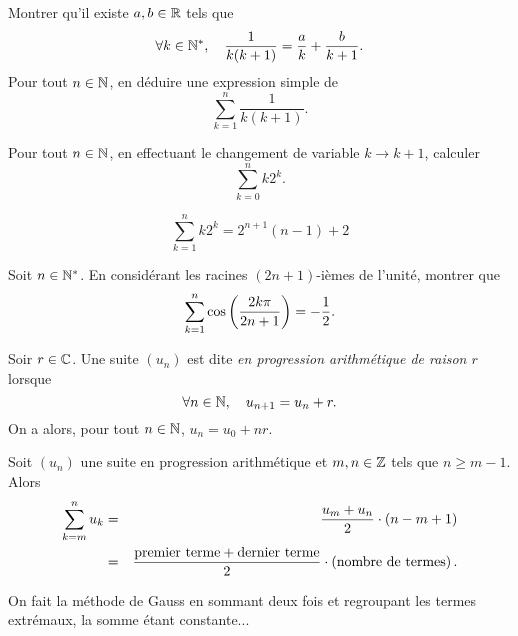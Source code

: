 \documentclass{magnoliaold}
\begin{document}
\begin{exos}
\exo
  \begin{questions}
  \question Montrer qu'il existe $a,b\in\mathbb{R}$ tels que
    \[\forall k\in{\mathbb{N}^*},\quad \frac{1}{k(k+1)}=\frac{a}{k}+\frac{b}{k+1}.\]
  \question Pour tout $n\in\mathbb{N}$, en déduire une expression simple de
    \[\sum_{k=1}^n \frac{1}{k(k+1)}.\]
  \end{questions}
\exo Pour tout $n\in\mathbb{N}$, en effectuant le changement de variable $k\to k+1$, calculer
  \[\sum_{k=0}^n k 2^k.\]
 \begin{sol}
\[\sum_{k=1}^n k 2^k=2^{n+1}(n-1)+2\]
 \end{sol}
\exo Soit $n\in{\mathbb{N}^*}$. En considérant les racines $(2n+1)$-ièmes de l'unité, montrer
  que
  \[\sum_{k=1}^n \cos\left(\frac{2k\pi}{2n+1}\right)=-\frac{1}{2}.\]
\end{exos}

  
\begin{definition}
Soir $r\in\mathbb{C}$. Une suite $(u_n)$ est dite \emph{en progression arithmétique de raison $r$} lorsque
\[\forall n \in \mathbb{N},\quad  u_{n+1}= u_n+r.\]
On a alors, pour tout $n \in \mathbb{N}$, $u_n = u_0 + nr$.
\end{definition}

\begin{proposition}
Soit $(u_n)$ une suite en progression arithmétique et $m,n\in\mathbb{Z}$ tels que $n\geq m-1$. Alors
\begin{eqnarray*}
\sum_{k=m}^n u_k
&=& \frac{u_m + u_n}{2}\cdot\left(n-m+1\right)\\
&=& \frac{\text{premier terme}+\text{dernier terme}}{2}\cdot
    \left(\text{nombre de termes}\right).
\end{eqnarray*}
\end{proposition}

\begin{preuve}
On fait la méthode de Gauss en sommant deux fois et regroupant les termes extrémaux, la somme étant constante...
\end{preuve}
\end{document}
